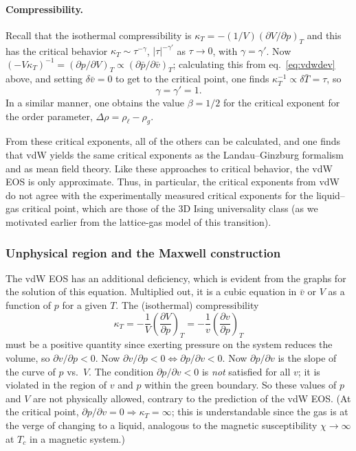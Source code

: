 \paragraph{Compressibility.} Recall that the isothermal compressibility is
$\kappa_T = -(1/V)\left(\partial V/\partial p\right)_T$ and this has the critical behavior
$\kappa_T\sim\tau^{-\gamma}$, $|\tau|^{-\gamma'}$ as $\tau\to 0$, with $\gamma = \gamma'$. Now
$(-V\kappa_T)^{-1} = \left(\partial p/\partial V\right)_T\propto\left(\partial\bar p/\partial\bar v\right)_T$;
calculating this from eq.~\eqref{eq:vdwdev} above, and setting $\delta\bar v = 0$ to get to the critical point, one
finds $\kappa_T^{-1}\propto\delta\bar T = \tau$, so
\begin{equation}
  \boxed{\gamma = \gamma' = 1}.
\end{equation}
In a similar manner, one obtains the value $\boxed{\beta = 1/2}$ for the critical exponent for the order
parameter, $\Delta\rho = \rho_\ell-\rho_g$.

From these critical exponents, all of the others can be calculated, and one finds that vdW yields the same
critical exponents as the Landau--Ginzburg formalism and as mean field theory. Like these approaches to critical
behavior, the vdW EOS is only approximate. Thus, in particular, the critical exponents from vdW do not agree with
the experimentally measured critical exponents for the liquid--gas critical point, which are those of the 3D Ising
universality class (as we motivated earlier from the lattice-gas model of this transition).

\subsubsection*{Unphysical region and the Maxwell construction}

The vdW EOS has an additional deficiency, which is evident from the graphs for the solution of this equation.
Multiplied out, it is a cubic equation in $\bar v$ or $V$ as a function of $p$ for a given $T$. The (isothermal)
compressibility
\begin{equation}
  \kappa_T = -\frac{1}{V}\left(\frac{\partial V}{\partial p}\right)_T = -\frac{1}{v}\left(\frac{\partial v}{\partial p}\right)_T
\end{equation}
must be a positive quantity since exerting pressure on the system reduces the volume, so
$\partial v/\partial p<0$. Now $\partial v/\partial p<0\Leftrightarrow\partial p/\partial v<0$.
Now $\partial p/\partial v$ is the slope of the curve of $p$ vs.\ $V$. The condition
$\partial p/\partial v<0$ is \emph{not} satisfied for all $v$; it is violated in the region of $v$ and $p$
within the green boundary. So these values of $p$ and $V$ are not physically allowed, contrary to the prediction of
the vdW EOS. (At the critical point, $\partial p/\partial v = 0\Rightarrow\kappa_T = \infty$; this is
understandable since the gas is at the verge of changing to a liquid, analogous to the magnetic susceptibility
$\chi\to\infty$ at $T_c$ in a magnetic system.)

